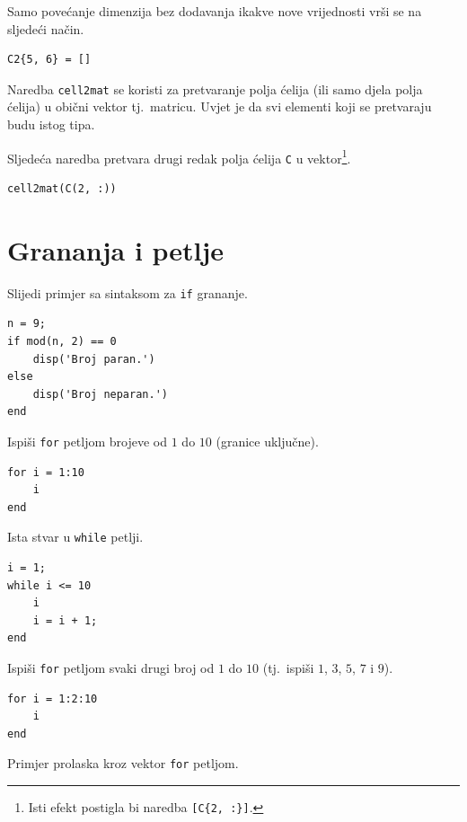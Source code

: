 \documentclass[a4paper, 10pt]{article}
\newcommand{\spec}[1]{\texttt{#1}} %
\begin{document}
Samo povećanje dimenzija bez dodavanja ikakve nove vrijednosti vrši se na sljedeći način.

\begin{lstlisting}
C2{5, 6} = []
\end{lstlisting}

Naredba \spec{cell2mat} se koristi za pretvaranje polja ćelija (ili samo djela polja ćelija) u obični vektor tj.\ matricu.
Uvjet je da svi elementi koji se pretvaraju budu istog tipa.

Sljedeća naredba pretvara drugi redak polja ćelija \spec{C} u vektor\footnote{Isti efekt postigla bi naredba \spec{[C\{2, :\}]}.}.

\begin{lstlisting}
cell2mat(C(2, :))
\end{lstlisting}


\section{Grananja i petlje}

Slijedi primjer sa sintaksom za \spec{if} grananje.

\begin{lstlisting}
n = 9;
if mod(n, 2) == 0
    disp('Broj paran.')
else
    disp('Broj neparan.')
end
\end{lstlisting}

Ispiši \spec{for} petljom brojeve od $1$ do $10$ (granice uključne).

\begin{lstlisting}
for i = 1:10
    i
end
\end{lstlisting}

Ista stvar u \spec{while} petlji.

\begin{lstlisting}
i = 1;
while i <= 10
    i
    i = i + 1;
end
\end{lstlisting}

Ispiši \spec{for} petljom svaki drugi broj od $1$ do $10$ (tj.\ ispiši $1$, $3$, $5$, $7$ i $9$).

\begin{lstlisting}
for i = 1:2:10
    i
end
\end{lstlisting}

Primjer prolaska kroz vektor \spec{for} petljom.
\end{document}
